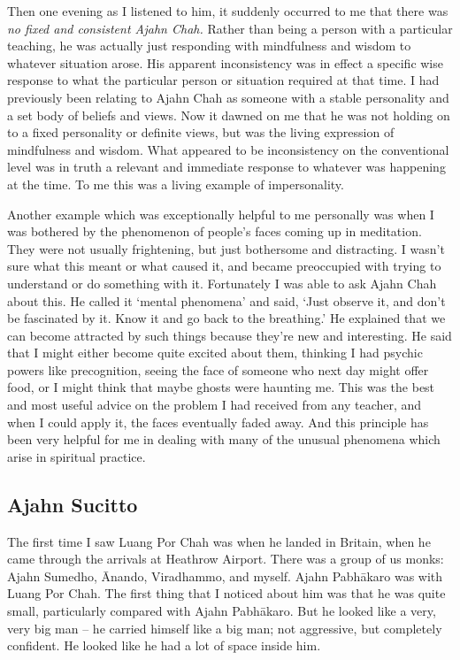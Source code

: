 Then one evening as I listened to him, it suddenly occurred to me that
there was \emph{no fixed and consistent Ajahn Chah.}
Rather than being a person
with a particular teaching, he was actually just responding with
mindfulness and wisdom to whatever situation arose. His apparent
inconsistency was in effect a specific wise response to what the
particular person or situation required at that time. I had previously
been relating to Ajahn Chah as someone with a stable personality and a
set body of beliefs and views. Now it dawned on me that he was not
holding on to a fixed personality or definite views, but was the living
expression of mindfulness and wisdom. What appeared to be inconsistency
on the conventional level was in truth a relevant and immediate response
to whatever was happening at the time. To me this was a living example
of impersonality. 

Another example which was exceptionally helpful to me personally was
when I was bothered by the phenomenon of people's faces coming up in
meditation. They were not usually frightening, but just bothersome and
distracting. I wasn't sure what this meant or what caused it, and became
preoccupied with trying to understand or do something with it. 
Fortunately I was able to ask Ajahn Chah about this. He called it
`mental phenomena' and said, `Just observe it, and don't be fascinated
by it. Know it and go back to the breathing.' He explained that we can
become attracted by such things because they're new and interesting. He
said that I might either become quite excited about them, thinking I had
psychic powers like precognition, seeing the face of someone who next
day might offer food, or I might think that maybe ghosts were haunting
me. This was the best and most useful advice on the problem I had received from any
teacher, and when I could apply it, the faces eventually faded away. And
this principle has been very helpful for me in dealing with many of the
unusual phenomena which arise in spiritual practice. 

\subsection{Ajahn Sucitto}

The first time I saw Luang Por Chah was when he landed in Britain, when
he came through the arrivals at Heathrow Airport. There was a group of
us monks: Ajahn Sumedho, Ānando, Viradhammo, and myself. Ajahn Pabhākaro
was with Luang Por Chah. The first thing that I noticed about him was
that he was quite small, particularly compared with Ajahn Pabhākaro. But
he looked like a very, very big man -- he carried himself like a big
man; not aggressive, but completely confident. He looked like he had a
lot of space inside him. 

